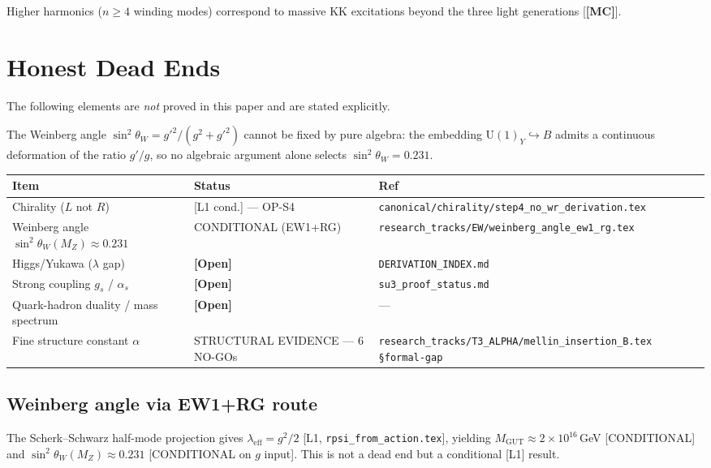 \documentclass[12pt,a4paper]{article}
\theoremstyle{definition}
\theoremstyle{remark}
\newcommand{\OPEN}{\textbf{[Open]}}
\newcommand{\MC}{\textbf{[MC]}}
\begin{document}
Higher harmonics ($n\geq 4$ winding modes) correspond to massive KK excitations
beyond the three light generations [\MC].

\section{Honest Dead Ends}
\label{sec:open}

The following elements are \emph{not} proved in this paper and are
stated explicitly.

The Weinberg angle $\sin^2\theta_W = g'^2/(g^2+g'^2)$ cannot be fixed by pure algebra: the embedding $\mathrm{U}(1)_Y\hookrightarrow B$ admits a continuous deformation of the ratio $g'/g$, so no algebraic argument alone selects $\sin^2\theta_W = 0.231$.

\begin{tcolorbox}[colback=orange!5!white,colframe=orange!55!black,
  title={Open Problems},breakable]
\begin{center}
\begin{tabular}{lll}
\toprule
\textbf{Item} & \textbf{Status} & \textbf{Ref} \\
\midrule
Chirality ($L$ not $R$) & [L1 cond.] --- OP-S4
  & \texttt{canonical/chirality/step4\_no\_wr\_derivation.tex} \\
Weinberg angle $\sin^2\theta_W(M_Z)\approx 0.231$ & CONDITIONAL (EW1+RG)
  & \texttt{research\_tracks/EW/weinberg\_angle\_ew1\_rg.tex} \\
Higgs/Yukawa ($\lambda$ gap) & \OPEN
  & \texttt{DERIVATION\_INDEX.md} \\
Strong coupling $g_s$ / $\alpha_s$ & \OPEN
  & \texttt{su3\_proof\_status.md} \\
Quark-hadron duality / mass spectrum & \OPEN & --- \\
Fine structure constant $\alpha$ & STRUCTURAL EVIDENCE --- 6 NO-GOs
  & \texttt{research\_tracks/T3\_ALPHA/mellin\_insertion\_B.tex \S formal-gap} \\
\bottomrule
\end{tabular}
\end{center}
\end{tcolorbox}

\subsection*{Weinberg angle via EW1+RG route}
The Scherk--Schwarz half-mode projection gives
$\lambda_{\mathrm{eff}} = g^2/2$ [L1, \texttt{rpsi\_from\_action.tex}],
yielding $M_{\mathrm{GUT}}\approx 2\times10^{16}$\,GeV [CONDITIONAL]
and $\sin^2\theta_W(M_Z)\approx 0.231$ [CONDITIONAL on $g$ input].
This is not a dead end but a conditional [L1] result.
\end{document}
